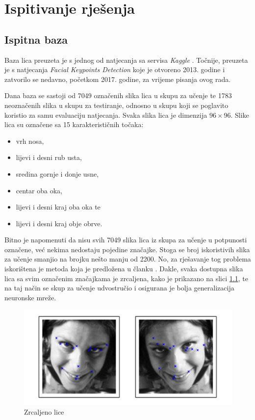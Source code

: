 \documentclass[times, utf8, zavrsni, numeric]{fer}
\begin{document}
\chapter{Ispitivanje rješenja}

\section{Ispitna baza}

Baza lica preuzeta je s jednog od natjecanja sa servisa \emph{Kaggle} \citep{kaggle}. Točnije, preuzeta je s natjecanja \emph{Facial Keypoints Detection} koje je otvoreno 2013. godine i zatvorilo se nedavno, početkom 2017. godine, za vrijeme pisanja ovog rada.

Dana baza se sastoji od 7049 označenih slika lica u skupu za učenje te 1783 neoznačenih slika u skupu za testiranje, odnosno u skupu koji se poglavito koristio za samu evaluaciju natjecanja. Svaka slika lica je dimenzija $96 \times 96$. Slike lica su označene sa 15 karakterističnih točaka:

\begin{itemize}
    \item vrh nosa, 
    \item lijevi i desni rub usta, 
    \item sredina gornje i donje usne, 
    \item centar oba oka,
    \item lijevi i desni kraj oba oka te 
    \item lijevi i desni kraj obje obrve.
\end{itemize}

Bitno je napomenuti da nisu svih 7049 slika lica iz skupa za učenje u potpunosti označene, već nekima nedostaju pojedine značajke. Stoga se broj iskoristivih slika za učenje smanjio na brojku nešto manju od 2200. No, za rješavanje tog problema iskorištena je metoda koja je predložena u članku \citep{daniel}. Dakle, svaka dostupna slika lica sa svim označenim značajkama je zrcaljena, kako je prikazano na slici \ref{fig:flip}, te na taj način se skup za učenje udvostručio i osigurana je bolja generalizacija neuronske mreže.

\begin{figure}[htb]
    \centering
    \includegraphics[width=12cm]{images/face_flip.png}
    \caption{Zrcaljeno lice}
    \label{fig:flip}
\end{figure}
\end{document}
